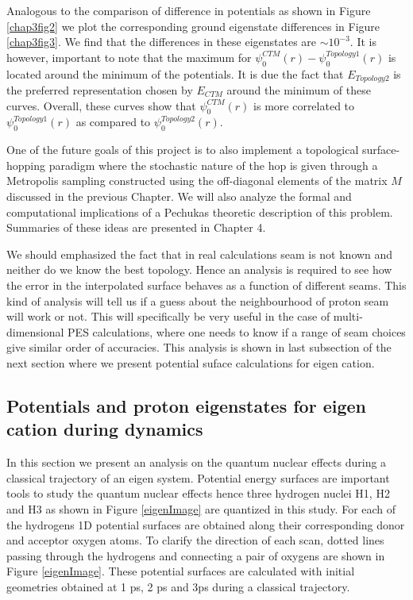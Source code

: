 Analogous to the comparison of difference in potentials as shown in Figure \ref{chap3fig2} we plot the corresponding
ground eigenstate differences in Figure \ref{chap3fig3}. We find that the differences in these eigenstates are
$\sim 10^{-3}$. It is however, important to note that the maximum for
$\psi_{0}^{CTM}(r)-\psi_{0}^{Topology1}(r)$ is located around the minimum of the potentials. It is due the fact that
$E_{Topology2}$ is the preferred representation chosen by $E_{CTM}$ around the minimum of these curves. Overall, these
curves show that $\psi_{0}^{CTM}(r)$ is more correlated to $\psi_{0}^{Topology1}(r)$ as compared to
$\psi_{0}^{Topology2}(r)$.

One of the future goals of this project is to also implement a topological surface-hopping
paradigm where the stochastic nature of the hop is given through a Metropolis sampling
constructed using the off-diagonal elements of the matrix $M$ discussed in the previous Chapter.
We will also analyze the formal and computational implications of a Pechukas theoretic
description of this problem. Summaries of these ideas are presented in Chapter 4.

We should emphasized the fact that in real calculations seam is not known and neither do we know
the best topology. Hence an analysis is required to see how the error in the interpolated surface behaves as a
function of different seams. This kind of analysis will tell us if a guess about the neighbourhood of
proton seam will work or not. This will specifically be very useful in the case of multi-dimensional PES
calculations, where one needs to know if a range of seam choices give similar order of accuracies. This analysis
is shown in last subsection of the next section where we present potential suface calculations for eigen cation.

\subsection{Potentials and proton eigenstates for eigen cation during dynamics}
{\label {eigenResults}}
In this section we present an analysis on the quantum nuclear effects during a classical trajectory of an eigen system.
Potential energy surfaces are important tools to study the quantum nuclear effects hence three hydrogen nuclei H1, H2
and H3 as shown in Figure \ref{eigenImage} are quantized in this study. For each of the hydrogens 1D potential surfaces
are obtained along their corresponding donor and acceptor oxygen atoms. To clarify the direction of each scan, dotted
lines passing through the hydrogens and connecting a pair of oxygens are shown in Figure \ref{eigenImage}. These
potential surfaces are calculated with initial geometries obtained at 1 ps, 2 ps and 3ps during a classical
trajectory.

